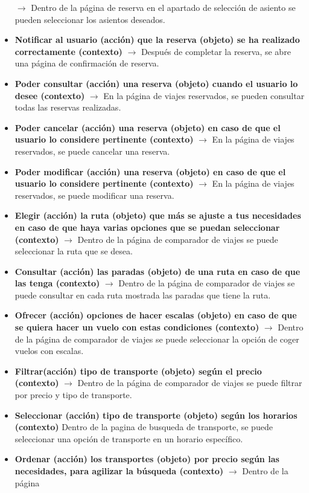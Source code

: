 \begin{itemize}
    $\rightarrow$ Dentro de la página de reserva en el apartado de selección de asiento se pueden seleccionar los asientos deseados.
    \item \textbf{Notificar al usuario (acción) que la reserva (objeto) se ha realizado correctamente (contexto)} $\rightarrow$ Después de completar la reserva, 
    se abre una página de confirmación de reserva.
    \item \textbf{Poder consultar (acción) una reserva (objeto) cuando el usuario lo desee (contexto)} $\rightarrow$ En la página de viajes reservados, se pueden
    consultar todas las reservas realizadas.
    \item \textbf{Poder cancelar (acción) una reserva (objeto) en caso de que el usuario lo considere pertinente (contexto)} $\rightarrow$ En la página de viajes 
    reservados, se puede cancelar una reserva.
    \item \textbf{Poder modificar (acción) una reserva (objeto) en caso de que el usuario lo considere pertinente (contexto)} $\rightarrow$ En la página de viajes 
    reservados, se puede modificar una reserva.
    \item \textbf{Elegir (acción) la ruta (objeto) que más se ajuste a tus necesidades en caso de que haya varias opciones que se puedan seleccionar (contexto)}
    $\rightarrow$ Dentro de la página de comparador de viajes se puede seleccionar la ruta que se desea.
    \item \textbf{Consultar (acción) las paradas (objeto) de una ruta en caso de que las tenga (contexto)} $\rightarrow$ Dentro de la página de comparador de viajes 
    se puede consultar en cada ruta mostrada las paradas que tiene la ruta.
    \item \textbf{Ofrecer (acción) opciones de hacer escalas (objeto) en caso de que se quiera hacer un vuelo con estas condiciones (contexto)} $\rightarrow$ Dentro 
    de la página de comparador de viajes se puede seleccionar la opción de coger vuelos con escalas.
    \item \textbf{Filtrar(acción) tipo de transporte (objeto) según el precio (contexto)} $\rightarrow$ Dentro de la página de comparador de viajes se puede filtrar 
    por precio y tipo de transporte.
    \item \textbf{Seleccionar (acción) tipo de transporte (objeto) según los horarios (contexto)} Dentro de la pagina de busqueda de transporte, se puede seleccionar 
    una opción de transporte en un horario específico.
    \item \textbf{Ordenar (acción) los transportes (objeto) por precio según las necesidades, para agilizar la búsqueda (contexto)} $\rightarrow$ Dentro de la página 

\end{itemize}
